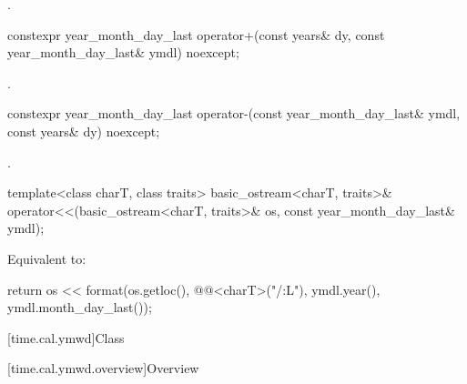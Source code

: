 \begin{itemdescr}
\pnum
\returns
{}.
\end{itemdescr}

%
\begin{itemdecl}
constexpr year_month_day_last
  operator+(const years& dy, const year_month_day_last& ymdl) noexcept;
\end{itemdecl}

\begin{itemdescr}
\pnum
\returns
{}.
\end{itemdescr}

%
\begin{itemdecl}
constexpr year_month_day_last
  operator-(const year_month_day_last& ymdl, const years& dy) noexcept;
\end{itemdecl}

\begin{itemdescr}
\pnum
\returns
{}.
\end{itemdescr}

%
\begin{itemdecl}
template<class charT, class traits>
  basic_ostream<charT, traits>&
    operator<<(basic_ostream<charT, traits>& os, const year_month_day_last& ymdl);
\end{itemdecl}

\begin{itemdescr}
\pnum
\effects
Equivalent to:
\begin{codeblock}
return os << format(os.getloc(), @@<charT>("{}/{:L}"),
                    ymdl.year(), ymdl.month_day_last());
\end{codeblock}
\end{itemdescr}

[time.cal.ymwd]{Class }

[time.cal.ymwd.overview]{Overview}


